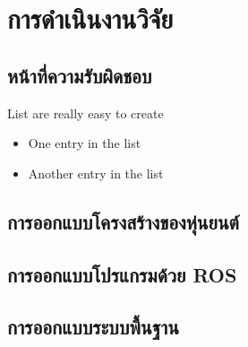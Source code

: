 \chapter{การดำเนินงานวิจัย}

\section{หน้าที่ความรับผิดชอบ}
List are really easy to create
 
\begin{itemize}
  \item One entry in the list
  \item Another entry in the list
\end{itemize}

\section{การออกแบบโครงสร้างของหุ่นยนต์}


\section{การออกแบบโปรแกรมด้วย ROS}


\section{การออกแบบระบบพื้นฐาน}

